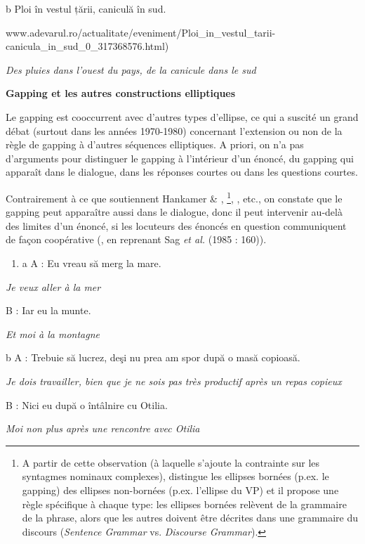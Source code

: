   b  Ploi în vestul țării, caniculă în sud.

    \textstyleapplestylespan{(}www.adevarul.ro/actualitate/eveniment/Ploi\_in\_vestul\_tarii-canicula\_in\_sud\_0\_317368576.html)

{\itshape
Des pluies dans l'ouest du pays, de la canicule dans le sud}

{\bfseries
Gapping et les autres constructions elliptiques}

Le gapping est cooccurrent avec d'autres types d'ellipse, ce qui a suscité un grand débat (surtout dans les années 1970-1980) concernant l'extension ou non de la règle de gapping à d'autres séquences elliptiques. A priori, on n'a pas d'arguments pour distinguer le gapping à l'intérieur d'un énoncé, du gapping qui apparaît dans le dialogue, dans les réponses courtes ou dans les questions courtes. 

Contrairement à ce que soutiennent Hankamer \& \citet{Sag1976}, \citet{Williams1977}\footnote{A partir de cette observation (à laquelle s'ajoute la contrainte sur les syntagmes nominaux complexes), \citet{Williams1977} distingue les ellipses bornées (p.ex. le gapping) des ellipses non-bornées (p.ex. l'ellipse du VP) et il propose une règle spécifique à chaque type: les ellipses bornées relèvent de la grammaire de la phrase, alors que les autres doivent être décrites dans une grammaire du discours (\textit{Sentence Grammar} vs. \textit{Discourse Grammar}).}, \citet{Lobeck1995}, etc., on constate que le gapping peut apparaître aussi dans le dialogue, donc il peut intervenir au-delà des limites d'un énoncé, si les locuteurs des énoncés en question communiquent de façon coopérative (\citet{Merchant2001}, en reprenant Sag \textit{et al.} (1985 : 160)).


\begin{enumerate}
\item a  A : Eu vreau să merg la mare.


\end{enumerate}
{\itshape
Je veux aller à la mer } 

    B : Iar eu la munte.

{\itshape
Et moi à la montagne}

  b  A : Trebuie să lucrez, deşi nu prea am spor după o masă copioasă.

{\itshape
Je dois travailler, bien que je ne sois pas très productif après un repas copieux } 

    B : Nici eu după o întâlnire cu Otilia.

{\itshape
Moi non plus après une rencontre avec Otilia} 

